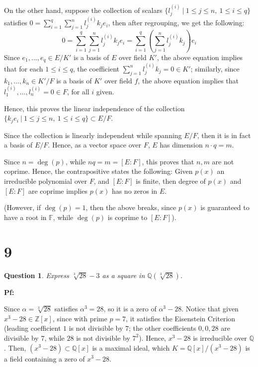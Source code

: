 \documentclass{article}
\newtheorem{question}{Question}
\begin{document}
On the other hand, suppose the collection of scalars $\{l_j^{(i)}\ |\ 1\leq j\leq n,\ 1\leq i\leq q\}$ satisfies $0=\sum_{i=1}^{q}\sum_{j=1}^{n}l_j^{(i)}k_je_i$, then after regrouping, we get the following:
$$0=\sum_{i=1}^{q}\sum_{j=1}^{n}l_j^{(i)}k_je_i= \sum_{i=1}^{q}\left(\sum_{j=1}^{n}l_j^{(i)}k_j\right)e_i$$
Since $e_1,...,e_q\in E/K'$ is a basis of $E$ over field $K'$, the above equation implies that for each $1\leq i\leq q$, the coefficient $\sum_{j=1}^{n}l_{j}^{(i)}k_j=0\in K'$;
similarly, since $k_1,...,k_n\in K'/F$ is a basis of $K'$ over field $f$, the above equation implies that $l_{1}^{(i)},...,l_n^{(i)}=0\in F$, for all $i$ given.

Hence, this proves the linear independence of the collection $\{k_je_i\ |\ 1\leq j\leq n,\ 1\leq i\leq q\}\subset E/F$.

Since the collection is linearly independent while spanning $E/F$, then it is in fact a basis of $E/F$. Hence, as a vector space over $F$, $E$ has dimension $n\cdot q = m$.

\hfil

Since $n=\deg(p)$, while $nq = m = [E:F]$, this proves that $n,m$ are not coprime. Hence, the contrapositive states the following:
Given $p(x)$ an irreducible polynomial over $F$, and $[E:F]$ is finite, then degree of $p(x)$ and $[E:F]$ are coprime implies $p(x)$ has no zeros in $E$.

(However, if $\deg(p)=1$, then the above breaks, since $p(x)$ is guaranteed to have a root in $\mathbb{F}$, while $\deg(p)$ is coprime to $[E:F]$).



\break

\section*{9}
\begin{myBox}[]{}
    \begin{question}
        Express $\sqrt[3]{28}-3$ as a square in $\mathbb{Q}(\sqrt[3]{28})$.
    \end{question}
\end{myBox}

\textbf{Pf:}

Since $\alpha=\sqrt[3]{28}$ satisfies $\alpha^3=28$, so it is a zero of $\alpha^3-28$.
Notice that given $x^3-28\in\mathbb{Z}[x]$, since with prime $p=7$, it satisfies the Eisenstein Criterion 
(leading coefficient $1$ is not divisible by $7$; the other coefficients $0,0,28$ are divisible by $7$, while $28$ is not divisible by $7^2$).
Hence, $x^3-28$ is irreducible over $\mathbb{Q}$. Then, $(x^3-28)\subset \mathbb{Q}[x]$ is a maximal ideal, which $K=\mathbb{Q}[x]/(x^3-28)$
is a field containing a zero of $x^3-28$.
\end{document}
